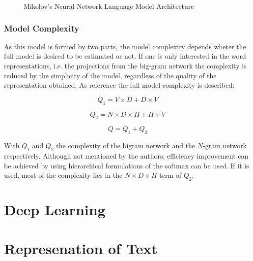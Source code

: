 \begin{figure}[hptb!]
    \centering
    \caption{Mikolov's Neural Network Language Model Architecture}
    \label{fig:mikolov_nnlm_architecture}
\end{figure}


\subsubsection{Model Complexity}

As this model is formed by two parts, the model complexity depends wheter the
full model is desired to be estimated or not. If one is only interested in
the word representations, i.e. the projections from the big-gram network the
complexity is reduced  by the simplicity of the model, regardless of the
quality of the representation obtained.  As reference the full model
complexity is described: 


\begin{equation} Q_1 = V \times D + D \times V  \end{equation}

\begin{equation} Q_2 =  N \times D \times H + H \times V   \end{equation}

\begin{equation} Q = Q_1 + Q_2
\end{equation}

With $Q_1$ and $Q_2$ the complexity of the bigram network and the $N$-gram
network respectively. Although not mentioned by the authors, efficiency
improvement can be achieved by using hierarchical formulations of the softmax
can be used. If it is used, most of the complexity  lies in the  $N \times D \times
H$ term of $Q_2$.






\section{Deep Learning}
\label{sec:deep_learning}


\section{Represenation of Text}
\label{sec:rel_represenation_text}


